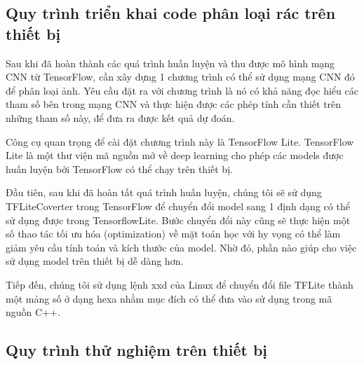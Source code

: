 \subsection{Quy trình triển khai code phân loại rác trên thiết bị}
Sau khi đã hoàn thành các quá trình huấn luyện và thu được mô hình mạng CNN từ TensorFlow, cần xây dựng 1 chương trình có thể sử dụng mạng CNN đó để phân loại ảnh. Yêu cầu đặt ra với chương trình là nó có khả năng đọc hiểu các tham số bên trong mạng CNN và thực hiện được các phép tính cần thiết trên những tham số này, để đưa ra được kết quả dự đoán.

Công cụ quan trọng để cài đặt chương trình này là TensorFlow Lite. TensorFlow Lite là một thư viện mã nguồn mở về deep learning cho phép các models được huấn luyện bởi TensorFlow có thể chạy trên thiết bị. 

Đầu tiên, sau khi đã hoàn tất quá trình huấn luyện, chúng tôi sẽ sử dụng TFLiteCoverter trong TensorFlow để chuyển đổi model sang 1 định dạng có thể sử dụng được trong TensorflowLite. Bước chuyển đổi này cũng sẽ thực hiện một số thao tác tối ưu hóa (optimization) về mặt toán học với hy vọng có thể làm giảm yêu cầu tính toán và kích thước của model. Nhờ đó, phần nào giúp cho việc sử dụng model trên thiết bị dễ dàng hơn.  

Tiếp đến, chúng tôi sử dụng lệnh xxd của Linux để chuyển đổi file TFLite thành một mảng số ở dạng hexa nhằm mục đích có thể đưa vào sử dụng trong mã nguồn C++.  

\subsection{Quy trình thử nghiệm trên thiết bị}


